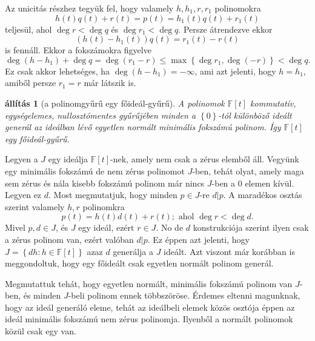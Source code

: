 \documentclass[9pt,showtrims]{memoir}
\makeatletter
\renewenvironment{proof}[1][\proofname]
    {\par\pushQED{\qed}%
    \normalfont \topsep6\p@\@plus6\p@\relax
    \trivlist
    \item[\hskip\labelsep
        \itshape
    #1\@addpunct{:}]\ignorespaces}
    {\popQED\endtrivlist\@endpefalse}
\theoremstyle{plain}
\newtheorem{proposition}{állítás}[chapter]
\theoremstyle{remark}
\theoremstyle{definition}
\renewcommand{\mathbf}{\mathbb}
\makeatother
\begin{document}
\begin{proof}
    Az unicitás részhez tegyük fel, hogy valamely $h,h_1,r,r_1$ polinomokra
    \[
        h\left( t \right)q\left( t \right)+r\left( t \right)
        =
        p\left( t \right)
        =
        h_1\left( t \right)q\left( t \right)+r_1\left( t \right)
    \]
    teljesül, ahol $\deg r<\deg q$ és $\deg r_1<\deg q$.
    Persze átrendezve ekkor
    \[
        \left( h\left( t \right)-h_1\left( t \right) \right)q\left( t \right)
        =
        r_1\left( t \right)-r\left( t \right)
    \]
    is fennáll.
    Ekkor a fokszámokra figyelve
    \[
        \deg\left( h-h_1 \right)+\deg q 
        = 
        \deg\left( r_1-r \right)
        \leq
        \max\left\{ \deg r_1,\deg (-r) \right\}
        <
        \deg q.
    \]
    Ez csak akkor lehetséges, ha $\deg\left( h-h_1 \right)=-\infty$,
    ami azt jelenti, hogy $h=h_1$, 
    amiből persze $r_1=r$ már látszik is.
\end{proof}
\begin{proposition}[a polinomgyűrű egy főideál-gyűrű]
    A polinomok $\mathbf{F}\left[ t \right]$ kommutatív, egységelemes, nullosztómentes gyűrűjében
    minden a $\left\{ 0 \right\}$-tól különböző ideált generál az ideálban lévő egyetlen normált minimális fokszámú polinom.
    Így $\mathbf{F}\left[ t \right]$ egy főideál-gyűrű.
\end{proposition}
\begin{proof}
    Legyen a $J$ egy ideálja $\mathbf{F}\left[ t \right]$-nek, 
    amely nem csak a zérus elemből áll.
    Vegyünk egy minimális fokszámú de nem zérus polinomot $J$-ben,
    tehát olyat, 
    amely maga sem zérus és nála kisebb fokszámú polinom már nincs $J$-ben a $0$ elemen kívül.
    Legyen ez $d$. 
    Most megmutatjuk, hogy minden $p\in J$-re $d|p$.
    A maradékos osztás szerint
    valamely $h,r$ polinomkra
    \[
        p\left( t \right)=
        h\left( t \right)d\left( t \right)+r\left( t \right);
        \text{ ahol }
        \deg r<\deg d.
    \]
    Mivel $p,d\in J$, és $J$ egy ideál, ezért $r\in J$.
    No de $d$ konstrukciója szerint ilyen csak a zérus polinom van,
    ezért valóban $d|p$.
    Ez éppen azt jelenti, hogy
    \(
        J=\left\{ dh:h\in\mathbf{F}\left[ t \right] \right\}
    \)
    azaz $d$ generálja a $J$ ideált.
    Azt viszont már korábban is meggondoltuk, 
    hogy egy főideált csak egyetlen normált polinom generál.

    Megmutattuk tehát, 
    hogy egyetlen normált, minimális fokszámú polinom van $J$-ben,
    és minden $J$-beli polinom ennek többszöröse.
\end{proof}
Érdemes eltenni magunknak, hogy az ideál generáló eleme, tehát az ideálbeli elemek közös osztója
éppen az ideál minimális fokszámú nem zérus polinomja.
Ilyenből a normált polinomok közül csak egy van.
\end{document}
